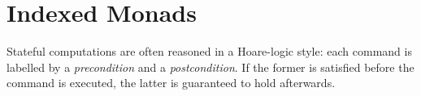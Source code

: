\newcommand{\framedhslinecorrect}[2]%
  {#1[#2]}

\newcommand{\framedhs}{\sethscode{framedhscode}}


\newenvironment{inlinehscode}%
  {\(\def\column##1##2{}%
   \let\>\undefined\let\<\undefined\let\\\undefined
   \newcommand\>[1][]{}\newcommand\<[1][]{}\newcommand\\[1][]{}%
   \def\fromto##1##2##3{##3}%
   \def\nextline{}}{\) }%

\newcommand{\inlinehs}{\sethscode{inlinehscode}}


\newenvironment{joincode}%
  {\let\orighscode=\hscode
   \let\origendhscode=\endhscode
   \def\endhscode{\def\hscode{\endgroup\def\@currenvir{hscode}\\}\begingroup}
   \orighscode\def\hscode{\endgroup\def\@currenvir{hscode}}}%
  {\origendhscode
   \global\let\hscode=\orighscode
   \global\let\endhscode=\origendhscode}%

\makeatother
\EndFmtInput
%

%
\makeatletter

\let\Varid\mathit
\let\Conid\mathsf

\def\commentbegin{\quad\{\ }
\def\commentend{\}}

\newcommand{\ty}[1]{\Conid{#1}}
\newcommand{\con}[1]{\Conid{#1}}
\newcommand{\id}[1]{\Varid{#1}}
\newcommand{\cl}[1]{\Varid{#1}}
\newcommand{\opsym}[1]{\mathrel{#1}}

\newcommand\Keyword[1]{\textbf{\textsf{#1}}}
\newcommand\Hide{\mathbin{\downarrow}}
\newcommand\Reveal{\mathbin{\uparrow}}




\makeatother
\EndFmtInput

\section{Indexed Monads}
\label{sec:indexed-monads}

Stateful computations are often reasoned in a Hoare-logic style: each command
is labelled by a \emph{precondition} and a \emph{postcondition}. If the former
is satisfied before the command is executed, the latter is guaranteed to hold
afterwards.


